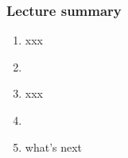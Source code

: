 \documentclass[english,14pt]{beamer}
\begin{document}

\begin{frame}[fragile]

\frametitle{Lecture summary}

\begin{enumerate}
	\item xxx
	
	\item[]
	
	\item xxx
	
	\item[]
	
	\item what's next
	
\end{enumerate}

\end{frame}
\end{document}
